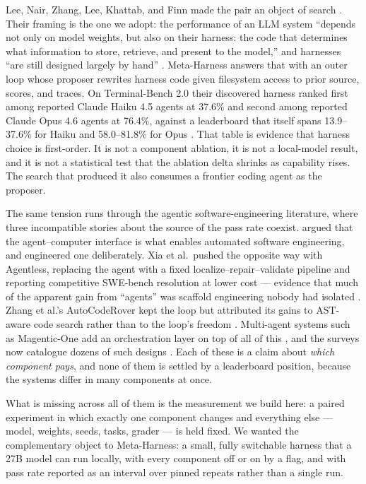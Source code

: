 \documentclass[
  10pt,
  a4paper,
]{article}
\newcounter{none} %
\begin{document}
Lee, Nair, Zhang, Lee, Khattab, and Finn made the pair an object of
search \citep{lee2026metaharness}. Their framing is the one we adopt:
the performance of an LLM system ``depends not only on model weights,
but also on their harness: the code that determines what information to
store, retrieve, and present to the model,'' and harnesses ``are still
designed largely by hand'' \citep{lee2026metaharness}. Meta-Harness
answers that with an outer loop whose proposer rewrites harness code
given filesystem access to prior source, scores, and traces. On
Terminal-Bench 2.0 \citep{merrill2026terminalbench} their discovered
harness ranked first among reported Claude Haiku 4.5 agents at 37.6\%
and second among reported Claude Opus 4.6 agents at 76.4\%, against a
leaderboard that itself spans 13.9--37.6\% for Haiku and 58.0--81.8\%
for Opus \citep[Table 7]{lee2026metaharness}. That table is evidence
that harness choice is first-order. It is not a component ablation, it
is not a local-model result, and it is not a statistical test that the
ablation delta shrinks as capability rises. The search that produced it
also consumes a frontier coding agent as the proposer.

The same tension runs through the agentic software-engineering
literature, where three incompatible stories about the source of the
pass rate coexist. \citet{yang2024sweagent} argued that the
agent--computer interface is what enables automated software
engineering, and engineered one deliberately. Xia et al.~pushed the
opposite way with Agentless, replacing the agent with a fixed
localize--repair--validate pipeline and reporting competitive SWE-bench
resolution at lower cost --- evidence that much of the apparent gain
from ``agents'' was scaffold engineering nobody had isolated
\citep{xia2024agentless, xia2025demystifying}. Zhang et al.'s
AutoCodeRover kept the loop but attributed its gains to AST-aware code
search rather than to the loop's freedom \citep{zhang2024autocoderover}.
Multi-agent systems such as Magentic-One add an orchestration layer on
top of all of this \citep{fourney2024magenticone}, and the surveys now
catalogue dozens of such designs \citep{liu2024survey}. Each of these is
a claim about \emph{which component pays}, and none of them is settled
by a leaderboard position, because the systems differ in many components
at once.

What is missing across all of them is the measurement we build here: a
paired experiment in which exactly one component changes and everything
else --- model, weights, seeds, tasks, grader --- is held fixed. We
wanted the complementary object to Meta-Harness: a small, fully
switchable harness that a 27B model can run locally, with every
component off or on by a flag, and with pass rate reported as an
interval over pinned repeats rather than a single run.
\end{document}
